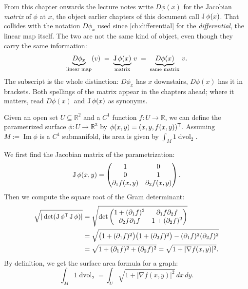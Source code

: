 \begin{remark}
\label{rem:notation_D_phi}
From this chapter onwards the lecture notes write $D\phi(x)$ for the Jacobian \emph{matrix} of
$\phi$ at $x$, the object earlier chapters of this document call $\operatorname{J}\phi(x)$. That collides
with the notation $D\phi_x$ used since \cref{ch:differential} for the \emph{differential}, the
linear map itself. The two are not the same kind of object, even though they carry the same
information:
\[\underbrace{D\phi_x}_{\text{linear map}}(v) \;=\; \underbrace{\operatorname{J}\phi(x)}_{\text{matrix}}\,v
  \;=\; \underbrace{D\phi(x)}_{\text{same matrix}}\,v.\]
The subscript is the whole distinction: $D\phi_x$ has $x$ downstairs, $D\phi(x)$ has it in
brackets. Both spellings of the matrix appear in the chapters ahead; where it matters, read
$D\phi(x)$ and $\operatorname{J}\phi(x)$ as synonyms.
\end{remark}

\begin{example}
\label{ex:integral_graph_function}
Given an open set $U \subseteq \mathbb{R}^2$ and a $C^1$ function $f: U \to \mathbb{R}$, we can define the parametrized surface $\phi: U \to \mathbb{R}^3$ by $\phi(x,y) = (x,y,f(x,y))^{\mathsf{T}}$.
Assuming $M := \operatorname{Im}\phi$ is a $C^1$ submanifold, its area is given by $\int_M 1 \mathop{d\text{vol}}_2$.

We first find the Jacobian matrix of the parametrization:
\[\operatorname{J}\phi(x,y) = \begin{pmatrix} 1 & 0 \\ 0 & 1 \\ \partial_1 f(x,y) & \partial_2 f(x,y) \end{pmatrix}.\]
Then we compute the square root of the Gram determinant:
\begin{align*}
\sqrt{|\det(\operatorname{J}\phi^{\mathsf{T}} \operatorname{J}\phi)|}
&= \sqrt{\det \begin{pmatrix} 1+(\partial_1 f)^2 & \partial_1 f \partial_2 f \\ \partial_2 f \partial_1 f & 1+(\partial_2 f)^2 \end{pmatrix}} \\
&= \sqrt{\big(1+(\partial_1 f)^2\big)\big(1+(\partial_2 f)^2\big) - (\partial_1 f)^2(\partial_2 f)^2} \\
&= \sqrt{1 + (\partial_1 f)^2 + (\partial_2 f)^2} = \sqrt{1+|\nabla f(x,y)|^2}.
\end{align*}
By definition, we get the surface area formula for a graph:
\[\int_M 1 \mathop{d\text{vol}}_2 = \int_U \sqrt{1+|\nabla f(x,y)|^2} \,dx\,dy.\]
\end{example}

